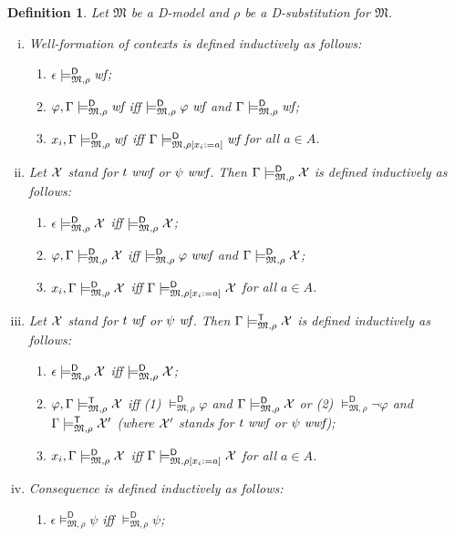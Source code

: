 \documentclass{article}
\newtheorem{definition}{Definition}[section]
\newcommand{\D}{\textsf D}
\newcommand{\ok}{\mbox{\em wf}}
\newcommand{\wf}{\ \mbox{\em wf}}
\newcommand{\wwf}{\ \mbox{\em wwf}}
\newcommand{\mymodelss}[3]{\ensuremath{\models_{\mathfrak{#2},{#3}}^{\mathsf{#1}}}}
\begin{document}
\begin{definition}\label{defn:Dconsequence}
Let $\mathfrak M$ be a {\D}-model and $\rho$ be a {\D}-substitution for
$\mathfrak M$.
\begin{enumerate}[(i)]
\item Well-formation of contexts is defined inductively as follows:
\begin{enumerate}
\item $\epsilon\mymodelss{D}M\rho\ok$;
\item $\varphi,\Gamma\mymodelss{D}M\rho\ok$ iff
$\mymodelss{D}M\rho\varphi\wf$ and $\Gamma\mymodelss{D}M\rho\ok$;
\item $x_i,\Gamma\mymodelss{D}M\rho\ok$ iff
$\Gamma\mymodelss{D}M{\rho[x_i:=a]}\ok$ for all $a\in A$.
\end{enumerate}
\item Let $\cal X$ stand for $t\wwf$ or $\psi\wwf$.  Then
$\Gamma\mymodelss{D}M\rho\cal X$ is defined inductively as follows:
\begin{enumerate}
\item $\epsilon\mymodelss{D}M\rho\cal X$ iff $\mymodelss{D}M\rho\cal X$;
\item $\varphi,\Gamma\mymodelss{D}M\rho\cal X$ iff
$\mymodelss{D}M\rho\varphi\wwf$ and $\Gamma\mymodelss{D}M\rho\cal X$;
\item $x_i,\Gamma\mymodelss{D}M\rho\cal X$ iff
$\Gamma\mymodelss{D}M{\rho[x_i:=a]}\cal X$ for all $a\in A$.
\end{enumerate}
\item Let $\cal X$ stand for $t\wf$ or $\psi\wf$.  Then
$\Gamma\mymodelss{T}M\rho\cal X$ is defined inductively as follows:
\begin{enumerate}
\item $\epsilon\mymodelss{D}M\rho\cal X$ iff $\mymodelss{D}M\rho\cal X$;
\item $\varphi,\Gamma\mymodelss{T}M\rho\cal X$ iff
(1) $\mymodelss{D}M\rho\varphi$ and $\Gamma\mymodelss{D}M\rho\cal X$ or
(2) $\mymodelss{D}M\rho\neg\varphi$ and $\Gamma\mymodelss{T}M\rho\cal X'$
(where $\cal X'$ stands for $t\wwf$ or $\psi\wwf$);
\item $x_i,\Gamma\mymodelss{D}M\rho\cal X$ iff
$\Gamma\mymodelss{D}M{\rho[x_i:=a]}\cal X$ for all $a\in A$.
\end{enumerate}
\item Consequence is defined inductively as follows:
\begin{enumerate}
\item $\epsilon\mymodelss{D}M\rho\psi$ iff $\mymodelss{D}M\rho\psi$;

\end{enumerate}
\end{enumerate}
\end{definition}
\end{document}
